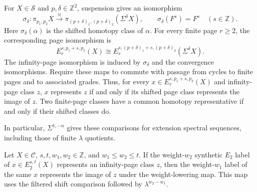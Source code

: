 \begin{definition}
\label{sem:AdamsSynthetic:ess-shifts}
For $X\in\mathcal S$ and $p,\delta\in\mathbb Z^2$, suspension gives
an isomorphism
\[
 \sigma_\delta:\pi_{p_1,p_2}X
   \xrightarrow{\cong}
   \pi_{(p+\delta)_1,(p+\delta)_2}(\Sigma^\delta X),
 \qquad \sigma_\delta(F^s)=F^s\quad(s\in\mathbb Z).
\]
Here $\sigma_\delta(\alpha)$ is the shifted homotopy class of $\alpha$.
For every finite page $r\geq2$, the corresponding page isomorphism is
\[
E_r^{s,p_1+s,p_2}(X)\cong
 E_r^{s,(p+\delta)_1+s,(p+\delta)_2}(\Sigma^\delta X).
\]
The infinity-page isomorphism is induced by $\sigma_\delta$ and the
convergence isomorphisms. Require these maps to commute with passage
from cycles to finite pages and to associated grades. Thus, for every
$x\in E_r^{s,p_1+s,p_2}(X)$ and infinity-page class $z$, $x$ represents
$z$ if and only if its shifted page class represents the image of $z$.
Two finite-page classes have a common homotopy representative if and
only if their shifted classes do.

In particular, $\Sigma^{1,-n}$ gives these comparisons for extension
spectral sequences, including those of finite $\lambda$ quotients.
\end{definition}



\begin{theorem}
\label{sem:AdamsSynthetic:weight-representative-input}
Let $X\in\mathcal C$, $s,t,w_1,w_2\in\mathbb Z$, and $w_1\leq w_2\leq t$. If the weight-$w_2$ synthetic $E_2$ label of $x\in E_2^{s,t}(X)$ represents an infinity-page class $z$, then the weight-$w_1$ label of the same $x$ represents the image of $z$ under the weight-lowering map. This map uses the filtered shift comparison followed by $\lambda^{w_2-w_1}$.
\end{theorem}


